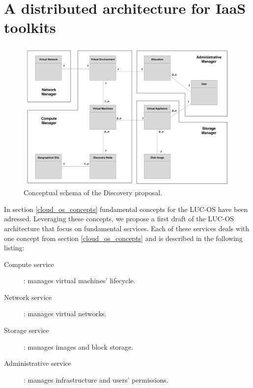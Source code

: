 \section{A distributed architecture for IaaS toolkits}

\begin{figure}
	\centering
	\includegraphics[width=0.91\linewidth]{Figures/mcd_3.pdf}
	\caption{Conceptual schema of the Discovery proposal.}%
	\label{fig:mcd}%
\end{figure}

In section \ref{cloud_os_concepts} fundamental concepts for the LUC-OS have been
adressed. Leveraging these concepts, we propose a first draft of the LUC-OS
architecture that focus on fundamental services. Each of these services deals 
with one concept from section \ref{cloud_os_concepts} and is described in the 
following listing:

\label{sub:sec:list_services}

\begin{description}

	\item [Compute service] : manages virtual machines' lifecycle.

	\item [Network service] : manages virtual networks.

	\item [Storage service] : manages images and block storage.

	\item [Administrative service] : manages infrastructure and users' permissions.  

\end{description}

